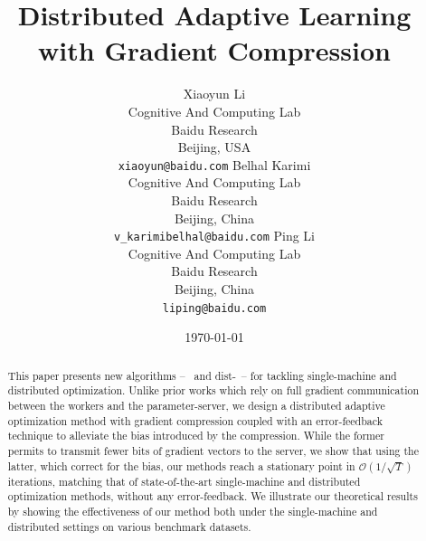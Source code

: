 \documentclass[11pt]{article}
\begin{document}
\title{Distributed Adaptive Learning with Gradient Compression}

\author{
Xiaoyun Li \\
  Cognitive And Computing Lab\\
  Baidu Research\\
  Beijing, USA \\
  \texttt{xiaoyun@baidu.com} 
   \And
  Belhal Karimi \\
  Cognitive And Computing Lab\\
  Baidu Research\\
  Beijing, China \\
  \texttt{v_karimibelhal@baidu.com} 
   \And
  Ping Li \\
  Cognitive And Computing Lab\\
  Baidu Research\\
  Beijing, China \\
  \texttt{liping@baidu.com} \\
}

\date{\today}

\maketitle

\begin{abstract}
This paper presents new algorithms -- \algo\ and dist-\algo\ -- for tackling single-machine and distributed optimization.
Unlike prior works which rely on full gradient communication between the workers and the parameter-server, we design a distributed adaptive optimization method with gradient compression coupled with an error-feedback technique to alleviate the bias introduced by the compression.
While the former permits to transmit fewer bits of gradient vectors to the server, we show that using the latter, which correct for the bias, our methods reach a stationary point in $\mathcal{O}(1/ \sqrt{T})$ iterations, matching that of state-of-the-art single-machine and distributed optimization methods, without any error-feedback.
We illustrate our theoretical results by showing the effectiveness of our method both under the single-machine and distributed settings on various benchmark datasets.
\end{abstract}
\end{document}
